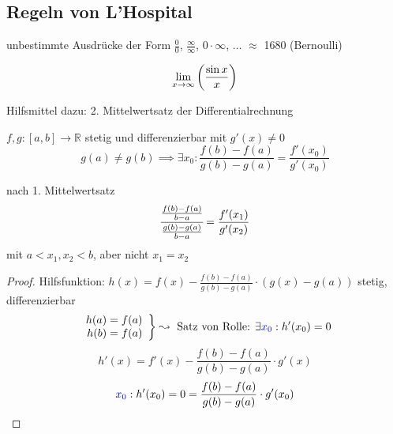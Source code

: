 
\subsection{Regeln von L'Hospital}

unbestimmte Ausdrücke der Form $\frac 0 0$, $\frac \infty \infty$, $0 \cdot \infty$, $\ldots$ $\approx$ 1680 (Bernoulli)
\begin{example}\[ \liminfty[x]{\frac{\sin x} x} \]\end{example}

\noindent Hilfsmittel dazu: 2. Mittelwertsatz der Differentialrechnung
\begin{theorem}
  $f,g: \left[a,b\right] \to \mathbb R$ stetig und differenzierbar mit $g'(x) \neq 0$
  \[ g(a) \neq g(b) \implies \exists x_0: \frac{f(b)-f(a)}{g(b)-g(a)}=\frac{f'(x_0)}{g'(x_0)}  \]
\end{theorem}
\begin{note}
  nach 1. Mittelwertsatz
  \begin{equation*} \cfrac{\frac{f(b)-f(a)}{b-a}}{\frac{g(b)-g(a)}{b-a}} = \frac{f'(x_1)}{g'(x_2)} \end{equation*}
  mit $a < x_1, x_2 < b$, aber nicht $x_1 = x_2$
\end{note}
\begin{proof}
  Hilfsfunktion: $h(x) = f(x) - \frac{f(b)-f(a)}{g(b)-g(a)} \cdot (g(x)-g(a))$ stetig, differenzierbar
  \[
    \left.\begin{array}{r}h(a) = f(a)\\h(b)=f(a)\end{array}\right\} \leadsto \text{ Satz von Rolle: } \exists \textcolor{blue}{x_0}: h'(x_0) = 0
  \]
  \[ h'(x) = f'(x) - \frac{f(b)-f(a)}{g(b)-g(a)} \cdot g'(x) \]
  \[ \textcolor{blue}{x_0}: h'(x_0) = 0 = \frac{f(b)-f(a)}{g(b)-g(a)} \cdot g'(x_0) \]
\end{proof}

